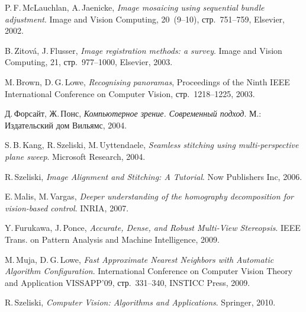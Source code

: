\documentclass[a4paper,12pt]{article}
\begin{document}
\begin{thebibliography}{99}
  P.\,F.\,McLauchlan, A.\,Jaenicke,
  \emph{Image mosaicing using sequential bundle adjustment}.
  Image and Vision Computing,
  20~(9--10),
  стр.~751--759,
  Elsevier,
  2002.

  B.\,Zitov\'a, J.\,Flusser,
  \emph{Image registration methods: a survey}.
  Image and Vision Computing,
  21,
  стр.~977--1000,
  Elsevier,
  2003.
  
  M.\,Brown, D.\,G.\,Lowe,
  \emph{Recognising panoramas},
  Proceedings of the Ninth IEEE International Conference on Computer Vision,
  стр.~1218--1225,
  2003.

  Д.\,Форсайт, Ж.\,Понс,
  \emph{Компьютерное зрение. Современный подход}.
  М.: Издательский дом {\guillemotleft}Вильямс{\guillemotright},
  2004.

  S.\,B.\,Kang, R.\,Szeliski, M.\,Uyttendaele,
  \emph{Seamless stitching using multi-perspective plane sweep}.
  Microsoft Research,
  2004.

  R.\,Szeliski,
  \emph{Image Alignment and Stitching: A Tutorial}.
  Now Publishers Inc,
  2006.

  E.\,Malis, M.\,Vargas,
  \emph{Deeper understanding of the homography decomposition for vision-based control}.
  INRIA,
  2007.

  Y.\,Furukawa, J.\,Ponce,
  \emph{Accurate, Dense, and Robust Multi-View Stereopsis}.
  IEEE Trans. on Pattern Analysis and Machine Intelligence,
  2009.
 
  M.\,Muja, D.\,G.\,Lowe,
  \emph{Fast Approximate Nearest Neighbors with Automatic Algorithm Configuration}.
  International Conference on Computer Vision Theory and Application VISSAPP'09,
  стр.~331--340,
  INSTICC Press,
  2009.

  R.\,Szeliski,
  \emph{Computer Vision: Algorithms and Applications}.
  Springer,
  2010.

\end{thebibliography}

\begin{comment}
\begin{flushright}
\begin{spacing}{1.5}
\begin{tabular}{l l l}
Студент & \noindent\underline{\makebox[2.5cm][l]{}} & В.\,В.\,Руцкий \\
Руководитель & \noindent\underline{\makebox[2.5cm][l]{}} & А.\,С.\,Ковалёв\\
\end{tabular}
\vspace{1cm}

\today
\end{spacing}
\end{flushright}
\end{comment}
\end{document}
